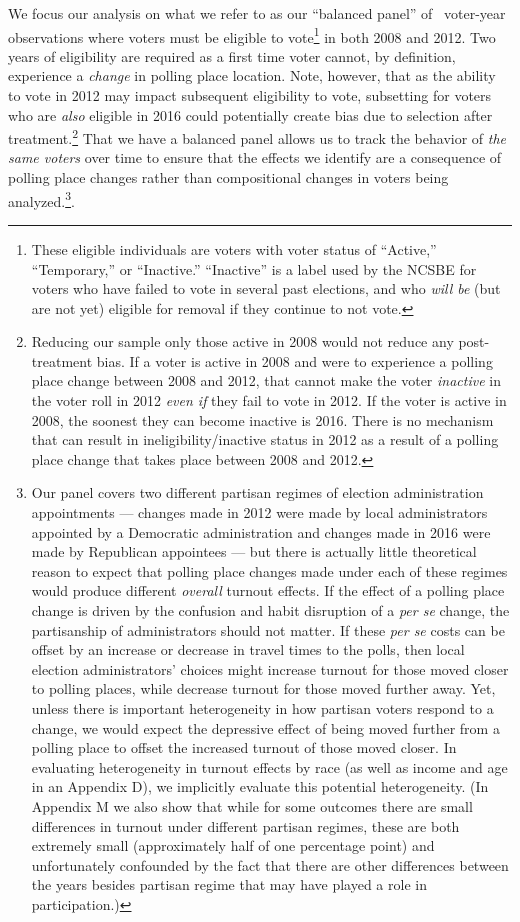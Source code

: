 \documentclass{cup_PSRM}
\begin{document}
We focus our analysis on what we refer to as our ``balanced panel'' of \unskip~voter-year observations where voters must be eligible to vote\footnote{These eligible individuals are voters with voter status of ``Active,'' ``Temporary,'' or ``Inactive.'' ``Inactive'' is a label used by the NCSBE for voters who have failed to vote in several past elections, and who \emph{will be} (but are not yet) eligible for removal if they continue to not vote.} in both 2008 and 2012.  Two years of eligibility are required as a first time voter cannot, by definition, experience a \emph{change} in polling place location. Note, however, that as the ability to vote in 2012 may impact subsequent eligibility to vote, subsetting for voters who are \emph{also} eligible in 2016 could potentially create bias due to selection after treatment.\footnote{Reducing our sample only those active in 2008 would not reduce any post-treatment bias.  If a voter is active in 2008 and were to experience a polling place change between 2008 and 2012, that cannot make the voter \emph{inactive} in the voter roll in 2012 \emph{even if} they fail to vote in 2012.  If the voter is active in 2008, the soonest they can become inactive is 2016.  There is no mechanism that can result in ineligibility/inactive status in 2012 as a result of a polling place change that takes place between 2008 and 2012.}  That we have a balanced panel allows us to track the behavior of \emph{the same voters} over time to ensure that the effects we identify are a consequence of polling place changes rather than compositional changes in voters being analyzed.\footnote{Our panel covers two different partisan regimes of election administration appointments --- changes made in 2012 were made by local administrators appointed by a Democratic administration and changes made in 2016 were made by Republican appointees --- but there is actually little theoretical reason to expect that polling place changes made under each of these regimes would produce different \emph{overall} turnout effects. If the effect of a polling place change is driven by the confusion and habit disruption of a \emph{per se} change, the partisanship of administrators should not matter.  If these \emph{per se} costs can be offset by an increase or decrease in travel times to the polls, then local election administrators' choices might increase turnout for those moved closer to polling places, while decrease turnout for those moved further away.  Yet, unless there is important heterogeneity in how partisan voters respond to a change, we would expect the depressive effect of being moved further from a polling place to offset the increased turnout of those moved closer.  In evaluating heterogeneity in turnout effects by race (as well as income and age in an Appendix D), we implicitly evaluate this potential heterogeneity. (In Appendix M we also show that while for some outcomes there are small differences in turnout under different partisan regimes, these are both extremely small (approximately half of one percentage point) and unfortunately confounded by the fact that there are other differences between the years besides partisan regime that may have played a role in participation.)}.
\end{document}
